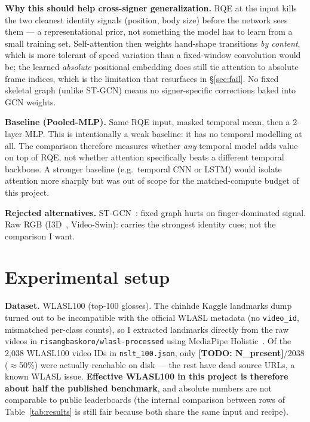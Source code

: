 \documentclass[11pt,a4paper]{article}
\newcommand{\todo}[1]{{\color{red}\textbf{[TODO: #1]}}}
\begin{document}
\textbf{Why this should help cross-signer generalization.} RQE at the input kills the two cleanest identity signals (position, body size) before the network sees them --- a representational prior, not something the model has to learn from a small training set. Self-attention then weights hand-shape transitions \emph{by content}, which is more tolerant of speed variation than a fixed-window convolution would be; the learned \emph{absolute} positional embedding does still tie attention to absolute frame indices, which is the limitation that resurfaces in \S\ref{sec:fail}. No fixed skeletal graph (unlike ST-GCN) means no signer-specific corrections baked into GCN weights.

\textbf{Baseline (Pooled-MLP).} Same RQE input, masked temporal mean, then a 2-layer MLP. This is intentionally a weak baseline: it has no temporal modelling at all. The comparison therefore measures whether \emph{any} temporal model adds value on top of RQE, not whether attention specifically beats a different temporal backbone. A stronger baseline (e.g.\ temporal CNN or LSTM) would isolate attention more sharply but was out of scope for the matched-compute budget of this project.

\textbf{Rejected alternatives.} ST-GCN~\cite{yan2018}: fixed graph hurts on finger-dominated signal. Raw RGB (I3D~\cite{carreira2017i3d}, Video-Swin): carries the strongest identity cues; not the comparison I want.

\section{Experimental setup}
\label{sec:setup}

\textbf{Dataset.} WLASL100 (top-100 glosses). The chinhde Kaggle landmarks dump turned out to be incompatible with the official WLASL metadata (no \texttt{video\_id}, mismatched per-class counts), so I extracted landmarks directly from the raw videos in \texttt{risangbaskoro/wlasl-processed} using MediaPipe Holistic~\cite{lugaresi2019mediapipe}. Of the 2{,}038 WLASL100 video IDs in \texttt{nslt\_100.json}, only \todo{N\_present}/2038 ($\approx$50\%) were actually reachable on disk --- the rest have dead source URLs, a known WLASL issue. \textbf{Effective WLASL100 in this project is therefore about half the published benchmark}, and absolute numbers are not comparable to public leaderboards (the internal comparison between rows of Table~\ref{tab:results} is still fair because both share the same input and recipe).
\end{document}

